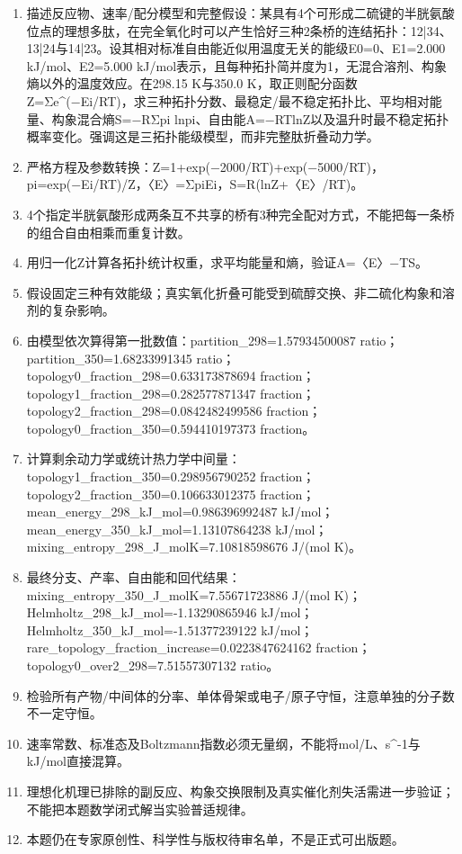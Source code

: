 \documentclass[UTF8,11pt,a4paper]{ctexart}
\begin{document}
\begin{enumerate}
\item 描述反应物、速率/配分模型和完整假设：某具有4个可形成二硫键的半胱氨酸位点的理想多肽，在完全氧化时可以产生恰好三种2条桥的连结拓扑：12|34、13|24与14|23。设其相对标准自由能近似用温度无关的能级E0=0、E1=2.000 kJ/mol、E2=5.000 kJ/mol表示，且每种拓扑简并度为1，无混合溶剂、构象熵以外的温度效应。在298.15 K与350.0 K，取正则配分函数Z=Σe\textasciicircum{}(−Ei/RT)，求三种拓扑分数、最稳定/最不稳定拓扑比、平均相对能量、构象混合熵S=−RΣpi lnpi、自由能A=−RTlnZ以及温升时最不稳定拓扑概率变化。强调这是三拓扑能级模型，而非完整肽折叠动力学。
\item 严格方程及参数转换：Z=1+exp(−2000/RT)+exp(−5000/RT)，pi=exp(−Ei/RT)/Z，〈E〉=ΣpiEi，S=R(lnZ+〈E〉/RT)。
\item 4个指定半胱氨酸形成两条互不共享的桥有3种完全配对方式，不能把每一条桥的组合自由相乘而重复计数。
\item 用归一化Z计算各拓扑统计权重，求平均能量和熵，验证A=〈E〉−TS。
\item 假设固定三种有效能级；真实氧化折叠可能受到硫醇交换、非二硫化构象和溶剂的复杂影响。
\item 由模型依次算得第一批数值：partition\_298=1.57934500087 ratio；partition\_350=1.68233991345 ratio；topology0\_fraction\_298=0.633173878694 fraction；topology1\_fraction\_298=0.282577871347 fraction；topology2\_fraction\_298=0.0842482499586 fraction；topology0\_fraction\_350=0.594410197373 fraction。
\item 计算剩余动力学或统计热力学中间量：topology1\_fraction\_350=0.298956790252 fraction；topology2\_fraction\_350=0.106633012375 fraction；mean\_energy\_298\_kJ\_mol=0.986396992487 kJ/mol；mean\_energy\_350\_kJ\_mol=1.13107864238 kJ/mol；mixing\_entropy\_298\_J\_molK=7.10818598676 J/(mol K)。
\item 最终分支、产率、自由能和回代结果：mixing\_entropy\_350\_J\_molK=7.55671723886 J/(mol K)；Helmholtz\_298\_kJ\_mol=-1.13290865946 kJ/mol；Helmholtz\_350\_kJ\_mol=-1.51377239122 kJ/mol；rare\_topology\_fraction\_increase=0.0223847624162 fraction；topology0\_over2\_298=7.51557307132 ratio。
\item 检验所有产物/中间体的分率、单体骨架或电子/原子守恒，注意单独的分子数不一定守恒。
\item 速率常数、标准态及Boltzmann指数必须无量纲，不能将mol/L、s\textasciicircum{}-1与kJ/mol直接混算。
\item 理想化机理已排除的副反应、构象交换限制及真实催化剂失活需进一步验证；不能把本题数学闭式解当实验普适规律。
\item 本题仍在专家原创性、科学性与版权待审名单，不是正式可出版题。
\end{enumerate}
\end{document}
